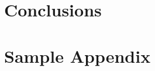 \documentclass[12pt]{report}
\begin{document}


\chapter{Conclusions}


\appendix


\chapter{Sample Appendix}


\printbibliography
\end{document}
